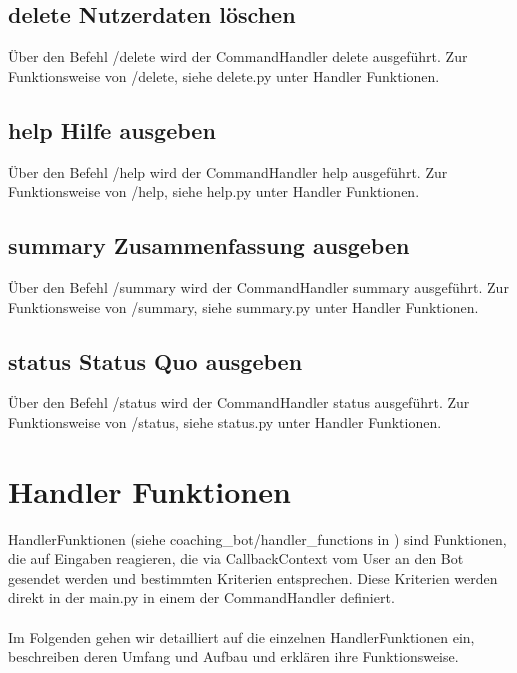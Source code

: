         \subsection{delete \- Nutzerdaten löschen}
            Über den Befehl /delete wird der CommandHandler delete ausgeführt. Zur Funktionsweise von /delete, siehe delete.py unter Handler Funktionen. 


        \subsection{help \- Hilfe ausgeben}
            Über den Befehl /help wird der CommandHandler help ausgeführt. Zur Funktionsweise von /help, siehe help.py unter Handler Funktionen. 


        \subsection{summary \- Zusammenfassung ausgeben}
            Über den Befehl /summary wird der CommandHandler summary ausgeführt. Zur Funktionsweise von /summary, siehe summary.py unter Handler Funktionen. 


        \subsection{status \- Status Quo ausgeben}
            Über den Befehl /status wird der CommandHandler status ausgeführt. Zur Funktionsweise von /status, siehe status.py unter Handler Funktionen. 


    \section{Handler Funktionen}
        Handler\-Funktionen (siehe coaching\_bot/handler\_functions in \cite{repo}) sind Funktionen, die auf Eingaben reagieren, die via CallbackContext vom User an den Bot gesendet werden und bestimmten Kriterien entsprechen. Diese Kriterien werden direkt in der main.py in einem der CommandHandler definiert. \\
        \\
        Im Folgenden gehen wir detailliert auf die einzelnen Handler\-Funktionen ein, beschreiben deren Umfang und Aufbau und erklären ihre Funktionsweise. 

